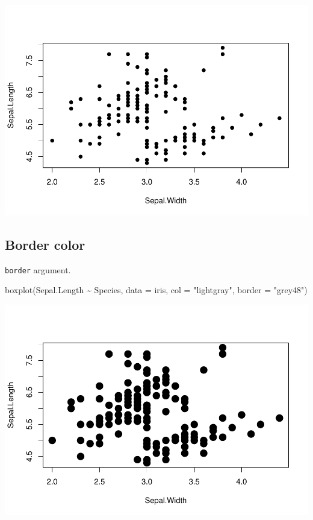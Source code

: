 \documentclass[
]{book}
\newenvironment{Shaded}{\begin{snugshade}}{\end{snugshade}}
\newcommand{\AttributeTok}[1]{\textcolor[rgb]{0.77,0.63,0.00}{#1}}
\newcommand{\FunctionTok}[1]{\textcolor[rgb]{0.00,0.00,0.00}{#1}}
\newcommand{\NormalTok}[1]{#1}
\newcommand{\SpecialCharTok}[1]{\textcolor[rgb]{0.00,0.00,0.00}{#1}}
\newcommand{\StringTok}[1]{\textcolor[rgb]{0.31,0.60,0.02}{#1}}
\begin{document}
\begin{center}\includegraphics{biostats_files/figure-latex/unnamed-chunk-124-1} \end{center}

\hypertarget{border-color}{%
\subsection{Border color}\label{border-color}}

\texttt{border} argument.

\begin{Shaded}
\begin{Highlighting}[]
\FunctionTok{boxplot}\NormalTok{(Sepal.Length }\SpecialCharTok{\textasciitilde{}}\NormalTok{ Species, }\AttributeTok{data =}\NormalTok{ iris,}
        \AttributeTok{col =} \StringTok{"lightgray"}\NormalTok{, }\AttributeTok{border =} \StringTok{"grey48"}\NormalTok{)}
\end{Highlighting}
\end{Shaded}

\begin{center}\includegraphics{biostats_files/figure-latex/unnamed-chunk-125-1} \end{center}
\end{document}
